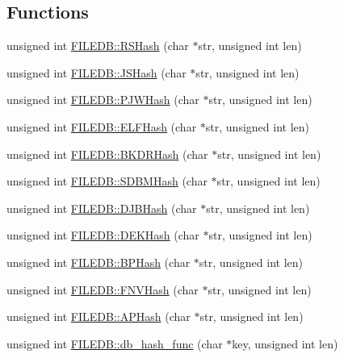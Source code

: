 \subsection*{Functions}
\begin{DoxyCompactItemize}
\item 
unsigned int \mbox{\hyperlink{namespaceFILEDB_ac69ca4109f796be06f658542b20a3eb1}{F\+I\+L\+E\+D\+B\+::\+R\+S\+Hash}} (char $\ast$str, unsigned int len)
\item 
unsigned int \mbox{\hyperlink{namespaceFILEDB_a3533131675008d2c3b9b3d1685b2e679}{F\+I\+L\+E\+D\+B\+::\+J\+S\+Hash}} (char $\ast$str, unsigned int len)
\item 
unsigned int \mbox{\hyperlink{namespaceFILEDB_ab2508d2100ad31133a86ce47aada4241}{F\+I\+L\+E\+D\+B\+::\+P\+J\+W\+Hash}} (char $\ast$str, unsigned int len)
\item 
unsigned int \mbox{\hyperlink{namespaceFILEDB_ad02d1b620691350d964deb5beab272eb}{F\+I\+L\+E\+D\+B\+::\+E\+L\+F\+Hash}} (char $\ast$str, unsigned int len)
\item 
unsigned int \mbox{\hyperlink{namespaceFILEDB_a06c984d24be338a8cfa3fcd1296914aa}{F\+I\+L\+E\+D\+B\+::\+B\+K\+D\+R\+Hash}} (char $\ast$str, unsigned int len)
\item 
unsigned int \mbox{\hyperlink{namespaceFILEDB_a93a0c708c1ad9c299200dbaa873c5531}{F\+I\+L\+E\+D\+B\+::\+S\+D\+B\+M\+Hash}} (char $\ast$str, unsigned int len)
\item 
unsigned int \mbox{\hyperlink{namespaceFILEDB_a7d5f1ce86b07fb3c5ec314fab9bd5e30}{F\+I\+L\+E\+D\+B\+::\+D\+J\+B\+Hash}} (char $\ast$str, unsigned int len)
\item 
unsigned int \mbox{\hyperlink{namespaceFILEDB_ab2561866ca3a62230f86ec7860fec260}{F\+I\+L\+E\+D\+B\+::\+D\+E\+K\+Hash}} (char $\ast$str, unsigned int len)
\item 
unsigned int \mbox{\hyperlink{namespaceFILEDB_a81bebe16f4e0ccc238b04621af6ada41}{F\+I\+L\+E\+D\+B\+::\+B\+P\+Hash}} (char $\ast$str, unsigned int len)
\item 
unsigned int \mbox{\hyperlink{namespaceFILEDB_ab7ad322a4b472713751d23b4b6495ddf}{F\+I\+L\+E\+D\+B\+::\+F\+N\+V\+Hash}} (char $\ast$str, unsigned int len)
\item 
unsigned int \mbox{\hyperlink{namespaceFILEDB_a23c71972866e86f222ad440284380f45}{F\+I\+L\+E\+D\+B\+::\+A\+P\+Hash}} (char $\ast$str, unsigned int len)
\item 
unsigned int \mbox{\hyperlink{namespaceFILEDB_a506040cd2b9f1527e415461aac226fb5}{F\+I\+L\+E\+D\+B\+::db\+\_\+hash\+\_\+func}} (char $\ast$key, unsigned int len)
\end{DoxyCompactItemize}
